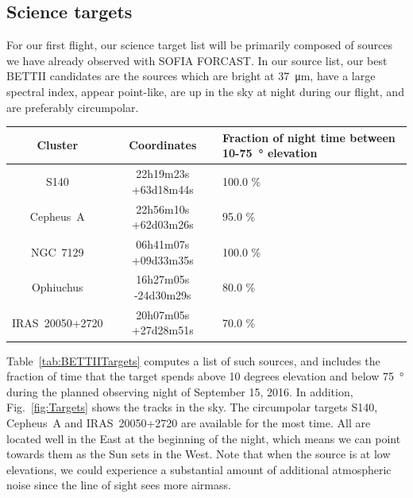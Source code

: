 \subsection{Science targets}
For our first flight, our science target list will be primarily composed of sources we have already observed with SOFIA FORCAST. In our source list, our best BETTII candidates are the sources which are bright at \SI{37}{\um}, have a large spectral index, appear point-like, are up in the sky at night during our flight, and are preferably circumpolar. 

\begin{table}[ht!]
\begin{center}
\caption{BETTII Targets}
\label{tab:BETTIITargets}
\vspace{-0.5cm}
\begin{longtable}{ccP{4cm}}
\toprule										
	Cluster	&	Coordinates	&	Fraction of night time between 10-\SI{75}{\degree} elevation		\\	
\midrule										
	S140	&	 22h19m23s +63d18m44s 	&	100.0	\%	\\		
	Cepheus~A	&	 22h56m10s +62d03m26s 	&	95.0	\%	\\	
	NGC~7129	&	 06h41m07s +09d33m35s 	&	100.0	\%	\\
	Ophiuchus	&	 16h27m05s -24d30m29s 	&	80.0	\%	\\	
	IRAS~20050+2720	&	 20h07m05s +27d28m51s 	&	70.0	\%	\\
\bottomrule										
\end{longtable}
\end{center}
\end{table}			

Table~\ref{tab:BETTIITargets} computes a list of such sources, and includes the fraction of time that the target spends above 10 degrees elevation and below \SI{75}{\degree} during the planned observing night of September 15, 2016. In addition, Fig.~\ref{fig:Targets} shows the tracks in the sky. The circumpolar targets S140, Cepheus~A and IRAS~20050+2720 are available for the most time. All are located well in the East at the beginning of the night, which means we can point towards them as the Sun sets in the West. Note that when the source is at low elevations, we could experience a substantial amount of additional atmospheric noise since the line of sight sees more airmass.

